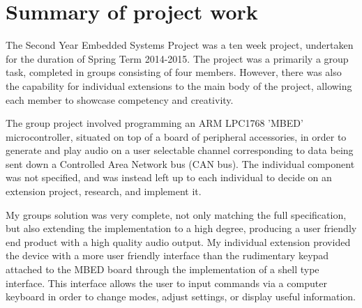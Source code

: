 \section{Summary of project work}
The Second Year Embedded Systems Project was a ten week project, undertaken 
for the duration of Spring Term 2014-2015. 
The project was a primarily a group task, completed in groups consisting of four 
members. 
However, there was also the capability for individual extensions to the main 
body of the project, allowing each member to showcase competency and creativity.
\par\bigskip\noindent
The group project involved programming an ARM LPC1768 'MBED' microcontroller, 
situated on top of a board of peripheral accessories, in order to 
generate and play audio on a user selectable channel corresponding to data 
being sent down a Controlled Area Network bus (CAN bus). 
The individual component was not specified, and was instead left up to each 
individual to decide on an extension project, research, and implement it. 
\par\bigskip\noindent
My groups solution was very complete, not only matching the full specification, 
but also extending the implementation to a high degree, producing a user 
friendly end product with a high quality audio output. 
My individual extension provided the device with a more user friendly 
interface than the rudimentary keypad attached to the MBED board through the 
implementation of a shell type interface. 
This interface allows the user to input commands via a computer keyboard in 
order to change modes, adjust settings, or display useful information.

 
